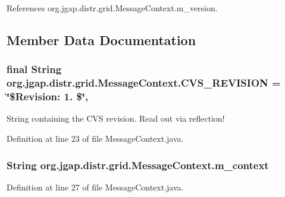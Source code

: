 References org.\-jgap.\-distr.\-grid.\-Message\-Context.\-m\-\_\-version.



\subsection{Member Data Documentation}
\hypertarget{classorg_1_1jgap_1_1distr_1_1grid_1_1_message_context_a89292919f7fda1fa9708c34da0be8642}{
\subsubsection[{C\-V\-S\-\_\-\-R\-E\-V\-I\-S\-I\-O\-N}]{\setlength{\rightskip}{0pt plus 5cm}final String org.\-jgap.\-distr.\-grid.\-Message\-Context.\-C\-V\-S\-\_\-\-R\-E\-V\-I\-S\-I\-O\-N = \char`\"{}\$Revision\-: 1. \$\char`\"{}\hspace{0.3cm}{\ttfamily [static]}, {\ttfamily [private]}}}\label{classorg_1_1jgap_1_1distr_1_1grid_1_1_message_context_a89292919f7fda1fa9708c34da0be8642}
String containing the C\-V\-S revision. Read out via reflection! 

Definition at line 23 of file Message\-Context.\-java.

\hypertarget{classorg_1_1jgap_1_1distr_1_1grid_1_1_message_context_a5dff978ddd347313874f39dd1e2b0c21}{
\subsubsection[{m\-\_\-context}]{\setlength{\rightskip}{0pt plus 5cm}String org.\-jgap.\-distr.\-grid.\-Message\-Context.\-m\-\_\-context\hspace{0.3cm}{\ttfamily [private]}}}\label{classorg_1_1jgap_1_1distr_1_1grid_1_1_message_context_a5dff978ddd347313874f39dd1e2b0c21}


Definition at line 27 of file Message\-Context.\-java.



